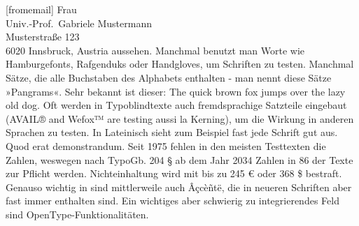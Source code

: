 \documentclass[german,noconfig,
]{uibklttr}
\begin{document}
\begin{letter}[fromemail]{%
  Frau\\
  Univ.-Prof.~Gabriele Mustermann\\
  Musterstraße 123\\
  6020 Innsbruck, Austria}
aussehen. Manchmal benutzt man Worte wie Hamburgefonts, Rafgenduks oder
Handgloves, um Schriften zu testen. Manchmal Sätze, die alle Buchstaben des
Alphabets enthalten - man nennt diese Sätze »Pangrams«. Sehr bekannt ist dieser:
The quick brown fox jumps over the lazy old dog. Oft werden in Typoblindtexte
auch fremdsprachige Satzteile eingebaut (AVAIL® and Wefox™ are testing aussi la
Kerning), um die Wirkung in anderen Sprachen zu testen. In Lateinisch sieht zum
Beispiel fast jede Schrift gut aus. Quod erat demonstrandum. Seit 1975 fehlen in
den meisten Testtexten die Zahlen, weswegen nach TypoGb. 204 § ab dem Jahr 2034
Zahlen in 86 der Texte zur Pflicht werden. Nichteinhaltung wird mit bis zu 245 €
oder 368 \$ bestraft.  Genauso wichtig in sind mittlerweile auch Âçcèñtë, die in
neueren Schriften aber fast immer enthalten sind. Ein wichtiges aber schwierig
zu integrierendes Feld sind OpenType-Funktionalitäten.
\end{letter}
\end{document}
